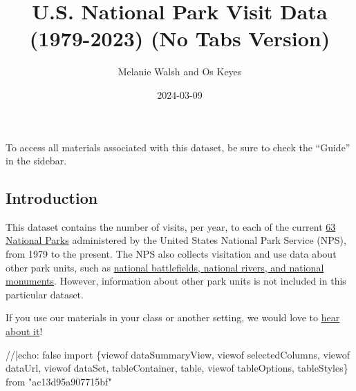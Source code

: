 \documentclass[
  letterpaper,
  DIV=11,
  numbers=noendperiod]{scrartcl}
\title{U.S. National Park Visit Data (1979-2023) (No Tabs Version)}
\author{Melanie Walsh and Os Keyes}
\date{2024-03-09}
\newenvironment{Shaded}{\begin{snugshade}}{\end{snugshade}}
\newcommand{\NormalTok}[1]{\textcolor[rgb]{0.00,0.23,0.31}{#1}}
\begin{document}
\maketitle

\begin{tcolorbox}[enhanced jigsaw, colframe=quarto-callout-warning-color-frame, titlerule=0mm, breakable, toprule=.15mm, opacitybacktitle=0.6, left=2mm, colback=white, bottomrule=.15mm, arc=.35mm, colbacktitle=quarto-callout-warning-color!10!white, bottomtitle=1mm, toptitle=1mm, title={Find All Materials in ``Guide''}, coltitle=black, rightrule=.15mm, opacityback=0, leftrule=.75mm]

To access all materials associated with this dataset, be sure to check
the ``Guide'' in the sidebar.

\end{tcolorbox}

\subsection{Introduction}\label{introduction}

This dataset contains the number of visits, per year, to each of the
current
\href{https://en.wikipedia.org/wiki/List_of_national_parks_of_the_United_States\#National_parks}{63
National Parks} administered by the United States National Park Service
(NPS), from 1979 to the present. The NPS also collects visitation and
use data about other park units, such as
\href{(https://www.nps.gov/aboutus/national-park-system.htm)}{national
battlefields, national rivers, and national monuments}. However,
information about other park units is not included in this particular
dataset.

\begin{tcolorbox}[enhanced jigsaw, colframe=quarto-callout-tip-color-frame, titlerule=0mm, breakable, toprule=.15mm, opacitybacktitle=0.6, left=2mm, colback=white, bottomrule=.15mm, arc=.35mm, colbacktitle=quarto-callout-tip-color!10!white, bottomtitle=1mm, toptitle=1mm, title={Brief Survey}, coltitle=black, rightrule=.15mm, opacityback=0, leftrule=.75mm]

If you use our materials in your class or another setting, we would love
to \href{https://forms.gle/yJpQscUH9k9Rn4Qy9}{hear about it}!

\end{tcolorbox}

\begin{Shaded}
\begin{Highlighting}[]
\NormalTok{//|echo: false}
\NormalTok{import \{viewof dataSummaryView, viewof selectedColumns, viewof dataUrl, viewof dataSet, tableContainer, table, viewof tableOptions, tableStyles\} from "ac13d95a907715bf"}
\end{Highlighting}
\end{Shaded}
\end{document}
